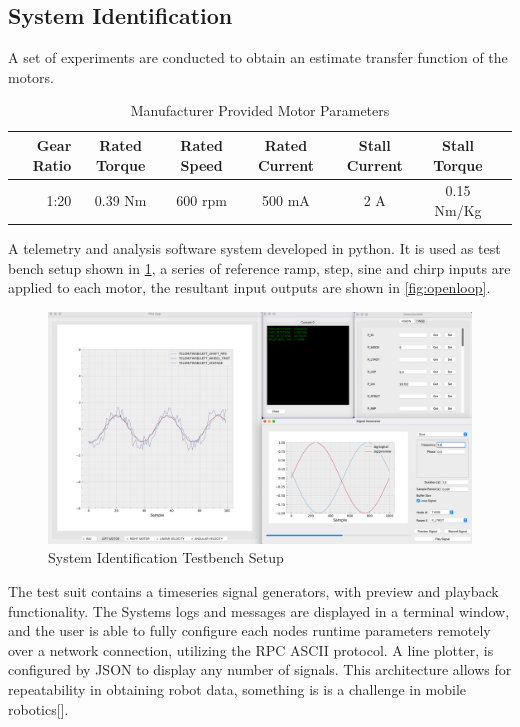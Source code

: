         \pagebreak{}

        \subsection{System Identification}
        A set of experiments are conducted to obtain an estimate transfer function of the motors.
        \begin{table}[H]
            \centering
                \begin{tabular}{|r|c|c|c|c|c|c|}
                    \hline 
                    Gear Ratio & Rated Torque & Rated Speed  & Rated Current & Stall Current & Stall Torque \\
                    \hline
                     1:20  & 0.39 Nm & 600 rpm & 500 mA & 2 A & 0.15 Nm/Kg \\
                    \hline
                \end{tabular}
                \caption{Manufacturer Provided Motor Parameters}
        \end{table}
        A telemetry and analysis software system developed in python. It is used as test bench setup 
        shown in \ref{fig:SysIDSetUp}, a series of reference ramp, step, sine and chirp inputs 
        are applied to each motor, the resultant input outputs are shown in \ref{fig:openloop}.
       
        \begin{figure}[H]
            \centering
            \includegraphics[height=0.45\textwidth]{SysIDMotorSetUp.png}
            \caption{System Identification Testbench Setup}
            \label{fig:SysIDSetUp}
        \end{figure}
        The test suit contains a timeseries signal generators, with preview and playback functionality.
        The Systems logs and messages are displayed in a terminal window, and the user is able to fully configure 
        each nodes runtime parameters remotely over a network connection, utilizing the RPC ASCII protocol.
        A line plotter, is configured by JSON to display any number of signals.
        This architecture allows for repeatability in obtaining robot data, something 
        is is a challenge in mobile robotics[]. 
        
